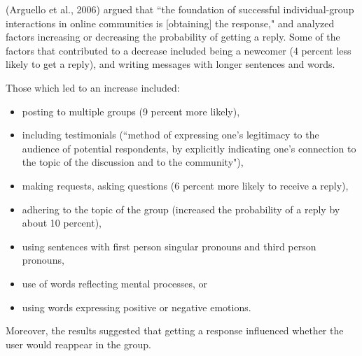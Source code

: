 \documentclass[10pt,dvipsnames]{scrartcl}
\begin{document}
(Arguello et al., 2006) argued that ``the foundation of successful
individual-group interactions in online communities is {[}obtaining{]}
the response," and analyzed factors increasing or decreasing the
probability of getting a reply. Some of the factors that contributed to
a decrease included being a newcomer (4 percent less likely to get a
reply), and writing messages with longer sentences and words.

Those which led to an increase included:

\begin{itemize}
    \item posting to multiple groups (9 percent more likely), 
    \item including testimonials (``method of expressing one's legitimacy to the audience of potential respondents, by explicitly indicating one's connection to the topic of the discussion and to the community"), 
    \item making requests, asking questions (6 percent more likely to receive a reply),
    \item adhering to the topic of the group (increased the probability of a reply by about 10 percent),
    \item using sentences with first person singular pronouns and third person pronouns,
    \item use of words reflecting mental processes, or
    \item using words expressing positive or negative emotions.
\end{itemize}

Moreover, the results suggested that getting a response influenced
whether the user would reappear in the group.
\end{document}
